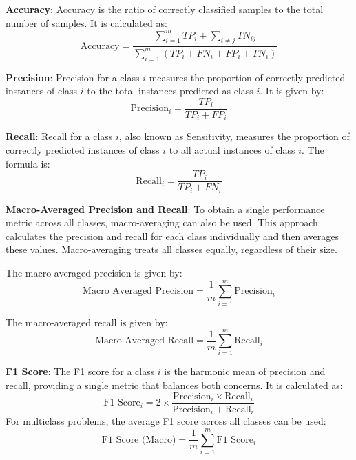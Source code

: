 \textbf{Accuracy}: Accuracy is the ratio of correctly classified samples to the total number of samples. It is calculated as:
\begin{equation}
    \text{Accuracy} = \frac{\sum_{i=1}^{m} TP_i + \sum_{i \neq j} TN_{ij}}{\sum_{i=1}^{m} (TP_i + FN_i + FP_i + TN_i)}
\end{equation}

\textbf{Precision}: Precision for a class $i$ measures the proportion of correctly predicted instances of class $i$ to the total instances predicted as class $i$. It is given by:
\begin{equation}
    \text{Precision}_i = \frac{TP_i}{TP_i + FP_i}
\end{equation}

\textbf{Recall}: Recall for a class $i$, also known as Sensitivity, measures the proportion of correctly predicted instances of class $i$ to all actual instances of class $i$. The formula is:
\begin{equation}
    \text{Recall}_i = \frac{TP_i}{TP_i + FN_i}
\end{equation}

\textbf{Macro-Averaged Precision and Recall}: To obtain a single performance metric across all classes, macro-averaging can also be used. This approach calculates the precision and recall for each class individually and then averages these values. Macro-averaging treats all classes equally, regardless of their size.

The macro-averaged precision is given by:
\begin{equation}
    \text{Macro Averaged Precision} = \frac{1}{m} \sum_{i=1}^{m} \text{Precision}_i
\end{equation}

The macro-averaged recall is given by:
\begin{equation}
    \text{Macro Averaged Recall} = \frac{1}{m} \sum_{i=1}^{m} \text{Recall}_i
\end{equation}

\textbf{F1 Score}: The F1 score for a class $i$ is the harmonic mean of precision and recall, providing a single metric that balances both concerns. It is calculated as:
\begin{equation}
\text{F1 Score}_i = 2 \times \frac{\text{Precision}_i \times \text{Recall}_i}{\text{Precision}_i + \text{Recall}_i}
\end{equation}
For multiclass problems, the average F1 score across all classes can be used:
\begin{equation}
\text{F1 Score (Macro)} = \frac{1}{m} \sum_{i=1}^{m} \text{F1 Score}_i
\end{equation}

